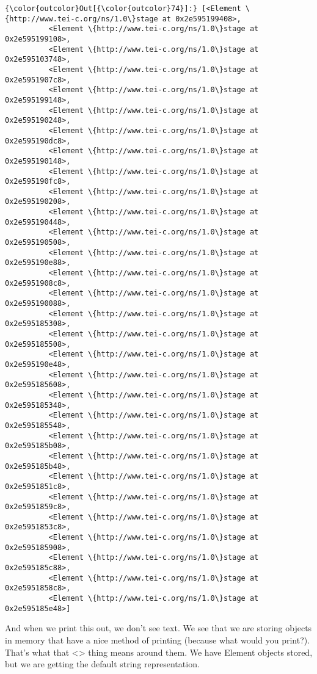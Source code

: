 \documentclass[11pt]{article}
\begin{document}
\begin{Verbatim}[commandchars=\\\{\}]
{\color{outcolor}Out[{\color{outcolor}74}]:} [<Element \{http://www.tei-c.org/ns/1.0\}stage at 0x2e595199408>,
          <Element \{http://www.tei-c.org/ns/1.0\}stage at 0x2e595199108>,
          <Element \{http://www.tei-c.org/ns/1.0\}stage at 0x2e595103748>,
          <Element \{http://www.tei-c.org/ns/1.0\}stage at 0x2e5951907c8>,
          <Element \{http://www.tei-c.org/ns/1.0\}stage at 0x2e595199148>,
          <Element \{http://www.tei-c.org/ns/1.0\}stage at 0x2e595190248>,
          <Element \{http://www.tei-c.org/ns/1.0\}stage at 0x2e595190dc8>,
          <Element \{http://www.tei-c.org/ns/1.0\}stage at 0x2e595190148>,
          <Element \{http://www.tei-c.org/ns/1.0\}stage at 0x2e595190fc8>,
          <Element \{http://www.tei-c.org/ns/1.0\}stage at 0x2e595190208>,
          <Element \{http://www.tei-c.org/ns/1.0\}stage at 0x2e595190448>,
          <Element \{http://www.tei-c.org/ns/1.0\}stage at 0x2e595190508>,
          <Element \{http://www.tei-c.org/ns/1.0\}stage at 0x2e595190e88>,
          <Element \{http://www.tei-c.org/ns/1.0\}stage at 0x2e5951908c8>,
          <Element \{http://www.tei-c.org/ns/1.0\}stage at 0x2e595190088>,
          <Element \{http://www.tei-c.org/ns/1.0\}stage at 0x2e595185308>,
          <Element \{http://www.tei-c.org/ns/1.0\}stage at 0x2e595185508>,
          <Element \{http://www.tei-c.org/ns/1.0\}stage at 0x2e595190e48>,
          <Element \{http://www.tei-c.org/ns/1.0\}stage at 0x2e595185608>,
          <Element \{http://www.tei-c.org/ns/1.0\}stage at 0x2e595185348>,
          <Element \{http://www.tei-c.org/ns/1.0\}stage at 0x2e595185548>,
          <Element \{http://www.tei-c.org/ns/1.0\}stage at 0x2e595185b08>,
          <Element \{http://www.tei-c.org/ns/1.0\}stage at 0x2e595185b48>,
          <Element \{http://www.tei-c.org/ns/1.0\}stage at 0x2e5951851c8>,
          <Element \{http://www.tei-c.org/ns/1.0\}stage at 0x2e5951859c8>,
          <Element \{http://www.tei-c.org/ns/1.0\}stage at 0x2e5951853c8>,
          <Element \{http://www.tei-c.org/ns/1.0\}stage at 0x2e595185908>,
          <Element \{http://www.tei-c.org/ns/1.0\}stage at 0x2e595185c88>,
          <Element \{http://www.tei-c.org/ns/1.0\}stage at 0x2e5951858c8>,
          <Element \{http://www.tei-c.org/ns/1.0\}stage at 0x2e595185e48>]
\end{Verbatim}
            
    And when we print this out, we don't see text. We see that we are
storing objects in memory that have a nice method of printing (because
what would you print?). That's what that \textless{}\textgreater{} thing
means around them. We have Element objects stored, but we are getting
the default string representation.
\end{document}
